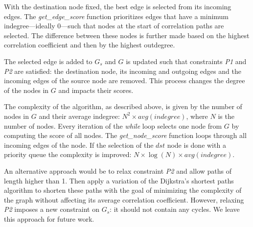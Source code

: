 With the destination node fixed, the best edge is selected from its incoming edges. The \textit{get\_edge\_score} function prioritizes edges that have a minimum indegree---ideally 0---such that nodes at the start of correlation paths are selected. The difference between these nodes is further made based on the highest correlation coefficient and then by the highest outdegree.

The selected edge is added to \(G_{s}\) and \(G\) is updated such that constraints \textit{P1} and \textit{P2} are satisfied: the destination node, its incoming and outgoing edges and the incoming edges of the source node are removed. This process changes the degree of the nodes in \(G\) and impacts their scores.

The complexity of the algorithm, as described above, is given by the number of nodes in \(G\) and their average indegree: \(N^2 \times avg(indegree)\), where \(N\) is the number of nodes. Every iteration of the \textit{while} loop selects one node from \(G\) by computing the score of all nodes. The \textit{get\_node\_score} function loops through all incoming edges of the node. If the selection of the \(dst\) node is done with a priority queue the complexity is improved: \(N \times \log(N) \times avg(indegree)\).

An alternative approach would be to relax constraint \textit{P2} and allow paths of length higher than 1. Then apply a variation of the Dijkstra's shortest paths algorithm to shorten these paths with the goal of minimizing the complexity of the graph without affecting its average correlation coefficient. However, relaxing  \textit{P2} imposes a new constraint on \(G_{s}\): it should not contain any cycles. We leave this approach for future work.

